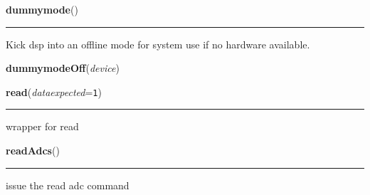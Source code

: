    \label{dsp:dummymode}

    \vspace{0.5ex}

    \begin{boxedminipage}{\textwidth}

    \raggedright \textbf{dummymode}()

    \vspace{-1.5ex}

    \rule{\textwidth}{0.5\fboxrule}
    Kick dsp into an offline mode for system use if no hardware available.

    \vspace{1ex}

    \end{boxedminipage}

    \label{dsp:dummymodeOff}

    \vspace{0.5ex}

    \begin{boxedminipage}{\textwidth}

    \raggedright \textbf{dummymodeOff}(\textit{device})

    \end{boxedminipage}

    \label{dsp:read}

    \vspace{0.5ex}

    \begin{boxedminipage}{\textwidth}

    \raggedright \textbf{read}(\textit{dataexpected}=\texttt{1})

    \vspace{-1.5ex}

    \rule{\textwidth}{0.5\fboxrule}
    wrapper for read

    \vspace{1ex}

    \end{boxedminipage}

    \label{dsp:readAdcs}

    \vspace{0.5ex}

    \begin{boxedminipage}{\textwidth}

    \raggedright \textbf{readAdcs}()

    \vspace{-1.5ex}

    \rule{\textwidth}{0.5\fboxrule}
    issue the read adc command

    \vspace{1ex}

    \end{boxedminipage}

